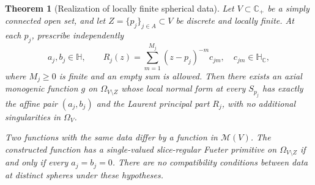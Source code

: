 \documentclass[11pt,a4paper]{article}
\numberwithin{equation}{section}
\newtheorem{theorem}{Theorem}[section]
\theoremstyle{definition}
\theoremstyle{remark}
\newcommand{\C}{\mathbb C}
\newcommand{\HH}{\mathbb H}
\newcommand{\HC}{\mathbb H_{\C}}
\newcommand{\Cp}{\C_+}
\newcommand{\cM}{\mathscr M}
\begin{document}
\begin{theorem}[Realization of locally finite spherical data]
\label{thm:ML}
Let $V\subset\Cp$ be a simply connected open set, and let
$Z=\{p_j\}_{j\in A}\subset V$ be discrete and locally finite. At each
$p_j$, prescribe independently
\[
 a_j,b_j\in\HH,\qquad
 R_j(z)=\sum_{m=1}^{M_j}(z-p_j)^{-m}c_{jm},
 \quad c_{jm}\in\HC,
\]
where $M_j\ge0$ is finite and an empty sum is allowed.
Then there exists an axial monogenic function $g$ on $\Omega_{V\setminus Z}$
whose local normal form at every $S_{p_j}$ has exactly the affine pair
$(a_j,b_j)$ and the Laurent principal part $R_j$, with no additional
singularities in $\Omega_V$.

Two functions with the same data differ by a function in $\cM(V)$.
The constructed function has a single-valued slice-regular Fueter primitive
on $\Omega_{V\setminus Z}$ if and only if every $a_j=b_j=0$.
There are no compatibility conditions between data at distinct spheres
under these hypotheses.
\end{theorem}
\end{document}
